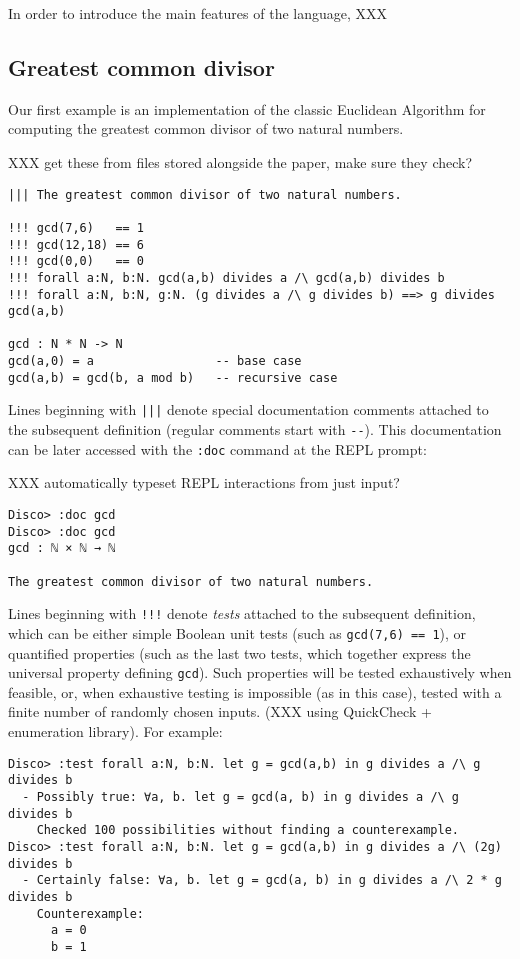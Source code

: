 \documentclass[submission,copyright,creativecommons]{eptcs}
\begin{document}
In order to introduce the main features of the language, XXX

\subsection{Greatest common divisor}
\label{sec:gcd}

Our first example is an implementation of the classic Euclidean
Algorithm for computing the greatest common divisor of two natural numbers.

XXX get these from files stored alongside the paper, make sure they check?
\begin{verbatim}
||| The greatest common divisor of two natural numbers.

!!! gcd(7,6)   == 1
!!! gcd(12,18) == 6
!!! gcd(0,0)   == 0
!!! forall a:N, b:N. gcd(a,b) divides a /\ gcd(a,b) divides b
!!! forall a:N, b:N, g:N. (g divides a /\ g divides b) ==> g divides gcd(a,b)

gcd : N * N -> N
gcd(a,0) = a                 -- base case
gcd(a,b) = gcd(b, a mod b)   -- recursive case
\end{verbatim}

Lines beginning with \texttt{|||} denote special documentation
comments attached to the subsequent definition (regular comments start with
\texttt{-{}-}).  This documentation can be later accessed with the
\texttt{:doc} command at the REPL prompt:

XXX automatically typeset REPL interactions from just input?
\begin{verbatim}
Disco> :doc gcd
Disco> :doc gcd
gcd : ℕ × ℕ → ℕ

The greatest common divisor of two natural numbers.
\end{verbatim}

Lines beginning with \texttt{!!!} denote \emph{tests} attached to the
subsequent definition, which can be either simple Boolean unit tests
(such as \verb|gcd(7,6) == 1|), or quantified properties (such as the
last two tests, which together express the universal property defining
\verb|gcd|).  Such properties will be tested exhaustively when
feasible, or, when exhaustive testing is impossible (as in this case),
tested with a finite number of randomly chosen inputs. (XXX using
QuickCheck + enumeration library).  For example:

\begin{verbatim}
Disco> :test forall a:N, b:N. let g = gcd(a,b) in g divides a /\ g divides b
  - Possibly true: ∀a, b. let g = gcd(a, b) in g divides a /\ g divides b
    Checked 100 possibilities without finding a counterexample.
Disco> :test forall a:N, b:N. let g = gcd(a,b) in g divides a /\ (2g) divides b
  - Certainly false: ∀a, b. let g = gcd(a, b) in g divides a /\ 2 * g divides b
    Counterexample:
      a = 0
      b = 1
\end{verbatim}
\end{document}
